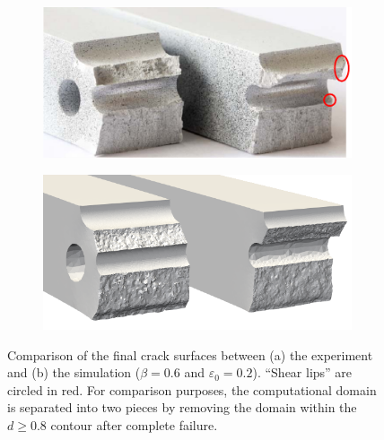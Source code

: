 \begin{figure}[!htb]
  \centering
  \begin{subfigure}[b]{0.4\textwidth}
    \centering
    \includegraphics[width=\textwidth,scale=0.5]{Chapter5/figures/3pb/split_experiment}
    \caption{}
  \end{subfigure}
  \begin{subfigure}[b]{0.4\textwidth}
    \centering
    \includegraphics[width=\textwidth,scale=0.5]{Chapter5/figures/3pb/split}
    \caption{}
  \end{subfigure}
  \caption[Comparison of the final crack surfaces between the experiment and the simulation.]{Comparison of the final crack surfaces between (a) the experiment \cite{kubik2019ductile} and (b) the simulation ($\beta = 0.6$ and $\varepsilon_0 = 0.2$). ``Shear lips'' are circled in red. For comparison purposes, the computational domain is separated into two pieces by removing the domain within the $d \ge 0.8$ contour after complete failure.}
  \label{fig: Chapter5/3pb/split_comparison}
\end{figure}
